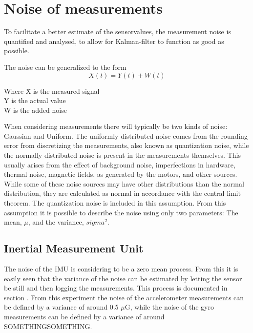 \chapter{Noise of measurements}
To facilitate a better estimate of the sensorvalues, the measurement noise is quantified and analysed, to allow for Kalman-filter to function as good as possible.

The noise can be generalized to the form
\begin{equation}
X(t) = Y(t) + W(t)
\end{equation}
\begin{tabbing}
Where \= X is the measured signal\\
	\> Y is the actual value\\
	\> W is the added noise 
\end{tabbing}
When considering measurements there will typically be two kinds of noise: Gaussian and Uniform. The uniformly distributed noise comes from the rounding error from discretizing the measurements, also known as quantization noise, while the normally distributed noise is present in the measurements themselves. This usually arises from the effect of background noise, imperfections in hardware, thermal noise, magnetic fields, as generated by the motors, and other sources. While some of these noise sources may have other distributions than the normal distribution, they are calculated as normal in accordance with the central limit theorem. The quantization noise is included in this assumption. From this assumption it is possible to describe the noise using only two parameters: The mean, $\mu$, and the variance, $sigma^{2}$.

\section{Inertial Measurement Unit}
The noise of the IMU is considering to be a zero mean process. From this it is easily seen that the variance of the noise can be estimated by letting the sensor be still and then logging the measurements. This process is documented in section . From this experiment the noise of the accelerometer measurements can be defined by a variance of around 0.5 $\mu$G, while the noise of the gyro measurements can be defined by a variance of around SOMETHINGSOMETHING.

